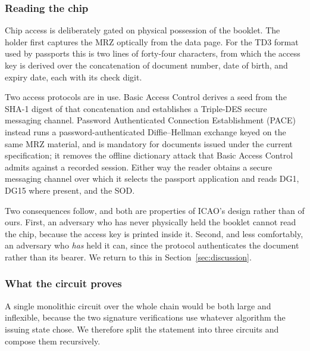 \documentclass[11pt,a4paper]{article}
\theoremstyle{definition}
\theoremstyle{plain}
\theoremstyle{remark}
\begin{document}
\subsubsection{Reading the chip}
\label{sec:chipread}

Chip access is deliberately gated on physical possession of the booklet. The holder first captures the MRZ optically from the data page. For the TD3 format used by passports this is two lines of forty-four characters, from which the access key is derived over the concatenation of document number, date of birth, and expiry date, each with its check digit.

Two access protocols are in use. Basic Access Control derives a seed from the SHA-1 digest of that concatenation and establishes a Triple-DES secure messaging channel. Password Authenticated Connection Establishment (PACE) instead runs a password-authenticated Diffie--Hellman exchange keyed on the same MRZ material, and is mandatory for documents issued under the current specification; it removes the offline dictionary attack that Basic Access Control admits against a recorded session. Either way the reader obtains a secure messaging channel over which it selects the passport application and reads DG1, DG15 where present, and the SOD.

Two consequences follow, and both are properties of ICAO's design rather than of ours. First, an adversary who has never physically held the booklet cannot read the chip, because the access key is printed inside it. Second, and less comfortably, an adversary who \emph{has} held it can, since the protocol authenticates the document rather than its bearer. We return to this in Section~\ref{sec:discussion}.

\subsubsection{What the circuit proves}
\label{sec:credcircuit}

A single monolithic circuit over the whole chain would be both large and inflexible, because the two signature verifications use whatever algorithm the issuing state chose. We therefore split the statement into three circuits and compose them recursively.
\end{document}
